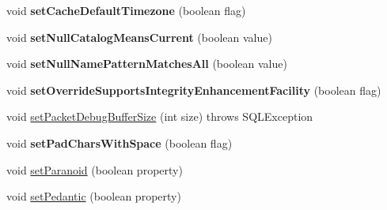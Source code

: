 \begin{DoxyCompactItemize}
\item 
\mbox{\label{classcom_1_1mysql_1_1jdbc_1_1jdbc2_1_1optional_1_1_connection_wrapper_a0c83514aa721310726c2653f32dc963a}} 
void {\bfseries set\+Cache\+Default\+Timezone} (boolean flag)
\item 
\mbox{\label{classcom_1_1mysql_1_1jdbc_1_1jdbc2_1_1optional_1_1_connection_wrapper_a059a94a27fd0e38878166525dc2ad83d}} 
void {\bfseries set\+Null\+Catalog\+Means\+Current} (boolean value)
\item 
\mbox{\label{classcom_1_1mysql_1_1jdbc_1_1jdbc2_1_1optional_1_1_connection_wrapper_a85fec49fef20116e050adc45da3d6a4a}} 
void {\bfseries set\+Null\+Name\+Pattern\+Matches\+All} (boolean value)
\item 
\mbox{\label{classcom_1_1mysql_1_1jdbc_1_1jdbc2_1_1optional_1_1_connection_wrapper_a118b0d369ddf5a7d622a7eb938770597}} 
void {\bfseries set\+Override\+Supports\+Integrity\+Enhancement\+Facility} (boolean flag)
\item 
void \mbox{\hyperlink{classcom_1_1mysql_1_1jdbc_1_1jdbc2_1_1optional_1_1_connection_wrapper_aaf10a4fb7d7079348a8ad47aafc4dedb}{set\+Packet\+Debug\+Buffer\+Size}} (int size)  throws S\+Q\+L\+Exception 
\item 
\mbox{\label{classcom_1_1mysql_1_1jdbc_1_1jdbc2_1_1optional_1_1_connection_wrapper_a28a62918c9311b5c0dfd670228d9cf1d}} 
void {\bfseries set\+Pad\+Chars\+With\+Space} (boolean flag)
\item 
void \mbox{\hyperlink{classcom_1_1mysql_1_1jdbc_1_1jdbc2_1_1optional_1_1_connection_wrapper_a246bc6ed913e7b8cf4950a88744c3d04}{set\+Paranoid}} (boolean property)
\item 
void \mbox{\hyperlink{classcom_1_1mysql_1_1jdbc_1_1jdbc2_1_1optional_1_1_connection_wrapper_a1c2af9306775ec3517e4aee8de864380}{set\+Pedantic}} (boolean property)
\item 
\mbox{\label{classcom_1_1mysql_1_1jdbc_1_1jdbc2_1_1optional_1_1_connection_wrapper_a22836562f2808f561f956cfe240aaa02}} 

\end{DoxyCompactItemize}
